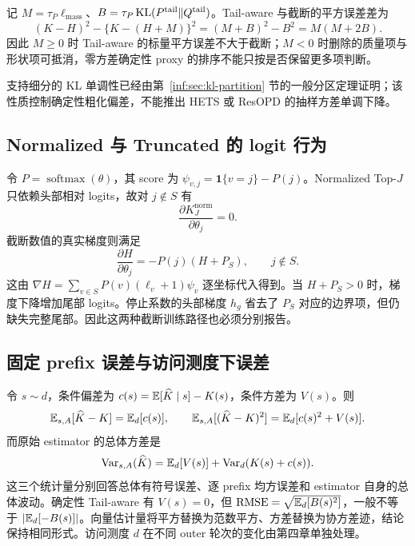 记 $M=\tau_P\ell_{\mathrm{mass}}$、$B=\tau_P\operatorname{KL}(P^{\mathrm{tail}}\Vert Q^{\mathrm{tail}})$。Tail-aware 与截断的平方误差差为
\begin{equation*}
 (K-H)^2-\{K-(H+M)\}^2=(M+B)^2-B^2=M(M+2B).
\end{equation*}
因此 $M\geq0$ 时 Tail-aware 的标量平方误差不大于截断；$M<0$ 时删除的质量项与形状项可抵消，零方差确定性 proxy 的排序不能只按是否保留更多项判断。

支持细分的 KL 单调性已经由第~\ref{inf:sec:kl-partition} 节的一般分区定理证明；该性质控制确定性粗化偏差，不能推出 HETS 或 ResOPD 的抽样方差单调下降。

\subsection{Normalized 与 Truncated 的 logit 行为}

令 $P=\operatorname{softmax}(\theta)$，其 score 为 $\psi_{v,j}=\mathbf1\{v=j\}-P(j)$。Normalized Top-$J$ 只依赖头部相对 logits，故对 $j\notin S$ 有
\begin{equation*}
 \frac{\partial K^{\mathrm{norm}}_J}{\partial\theta_j}=0.
\end{equation*}
截断数值的真实梯度则满足
\begin{equation*}
 \frac{\partial H}{\partial\theta_j}=-P(j)(H+P_S),\qquad j\notin S.
\end{equation*}
这由 $\nabla H=\sum_{v\in S}P(v)(\ell_v+1)\psi_v$ 逐坐标代入得到。当 $H+P_S>0$ 时，梯度下降增加尾部 logits。停止系数的头部梯度 $h_g$ 省去了 $P_S$ 对应的边界项，但仍缺失完整尾部。因此这两种截断训练路径也必须分别报告。

\subsection{固定 prefix 误差与访问测度下误差}

令 $s\sim d$，条件偏差为 $c(s)=\mathbb E[\widehat K\mid s]-K(s)$，条件方差为 $V(s)$。则
\begin{equation*}
 \mathbb E_{s,A}[\widehat K-K]=\mathbb E_d[c(s)],\qquad
 \mathbb E_{s,A}[(\widehat K-K)^2]=\mathbb E_d[c(s)^2+V(s)].
\end{equation*}
而原始 estimator 的总体方差是
\begin{equation*}
 \operatorname{Var}_{s,A}(\widehat K)
 =\mathbb E_d[V(s)]+\operatorname{Var}_d(K(s)+c(s)).
\end{equation*}
这三个统计量分别回答总体有符号误差、逐 prefix 均方误差和 estimator 自身的总体波动。确定性 Tail-aware 有 $V(s)=0$，但 $\operatorname{RMSE}=\sqrt{\mathbb E_d[B(s)^2]}$，一般不等于 $|\mathbb E_d[-B(s)]|$。向量估计量将平方替换为范数平方、方差替换为协方差迹，结论保持相同形式。访问测度 $d$ 在不同 outer 轮次的变化由第四章单独处理。
